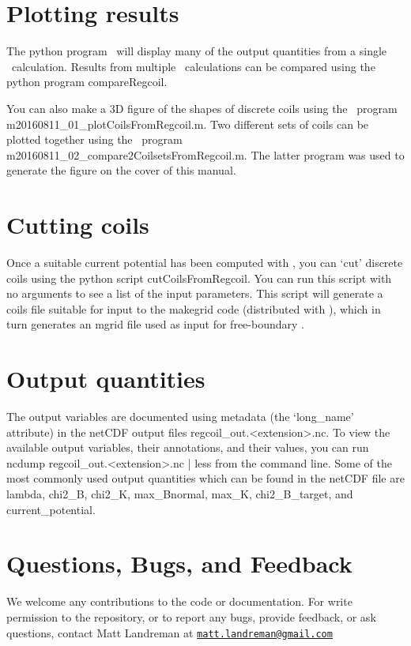 \section{Plotting results}

The python program \regcoilPlot~will display many of the output quantities from a single \regcoil~calculation.
Results from multiple \regcoil~calculations can be compared using the python program {\ttfamily compareRegcoil}.

You can also make a 3D figure of the shapes of discrete coils using the \matlab~program {\ttfamily m20160811\_01\_plotCoilsFromRegcoil.m}.
Two different sets of coils can be plotted together using the \matlab~program {\ttfamily m20160811\_02\_compare2CoilsetsFromRegcoil.m}.
The latter program was used to generate the figure on the cover of this manual.

\section{Cutting coils}

Once a suitable current potential has been computed with \regcoil, you can `cut' discrete coils
using the python script {\ttfamily cutCoilsFromRegcoil}. You can run this script with no arguments
to see a list of the input parameters. This script will generate a coils file suitable for input to the
{\ttfamily makegrid} code (distributed with \vmec), which in turn generates an mgrid file used as input for free-boundary \vmec.

\section{Output quantities}

The output variables are documented using metadata (the `{\ttfamily long\_name}' attribute)
in the netCDF output files {\ttfamily regcoil\_out.<extension>.nc}.
To view the available output variables, their annotations, and their values, you can run
{\ttfamily ncdump regcoil\_out.<extension>.nc | less} from the command line.
Some of the most commonly used output quantities which can be found in the netCDF file are 
{\ttfamily lambda},
{\ttfamily chi2\_B},
{\ttfamily chi2\_K},
{\ttfamily max\_Bnormal},
{\ttfamily max\_K},
{\ttfamily chi2\_B\_target},
and
{\ttfamily current\_potential}.

\section{Questions, Bugs, and Feedback}

We welcome any contributions to the code or documentation.
For write permission to the repository, or to report any bugs, provide feedback, or ask questions, contact Matt Landreman at
\href{mailto:matt.landreman@gmail.com}{\nolinkurl{matt.landreman@gmail.com} }






